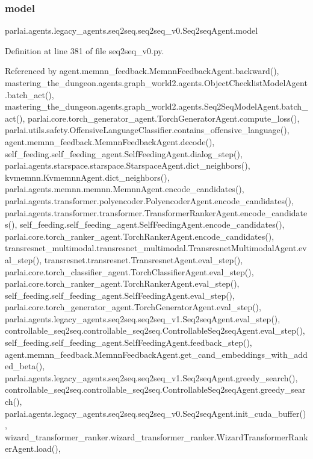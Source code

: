 \subsubsection{\texorpdfstring{model}{model}}
{\footnotesize\ttfamily parlai.\+agents.\+legacy\+\_\+agents.\+seq2seq.\+seq2seq\+\_\+v0.\+Seq2seq\+Agent.\+model}



Definition at line 381 of file seq2seq\+\_\+v0.\+py.



Referenced by agent.\+memnn\+\_\+feedback.\+Memnn\+Feedback\+Agent.\+backward(), mastering\+\_\+the\+\_\+dungeon.\+agents.\+graph\+\_\+world2.\+agents.\+Object\+Checklist\+Model\+Agent.\+batch\+\_\+act(), mastering\+\_\+the\+\_\+dungeon.\+agents.\+graph\+\_\+world2.\+agents.\+Seq2\+Seq\+Model\+Agent.\+batch\+\_\+act(), parlai.\+core.\+torch\+\_\+generator\+\_\+agent.\+Torch\+Generator\+Agent.\+compute\+\_\+loss(), parlai.\+utils.\+safety.\+Offensive\+Language\+Classifier.\+contains\+\_\+offensive\+\_\+language(), agent.\+memnn\+\_\+feedback.\+Memnn\+Feedback\+Agent.\+decode(), self\+\_\+feeding.\+self\+\_\+feeding\+\_\+agent.\+Self\+Feeding\+Agent.\+dialog\+\_\+step(), parlai.\+agents.\+starspace.\+starspace.\+Starspace\+Agent.\+dict\+\_\+neighbors(), kvmemnn.\+Kvmemnn\+Agent.\+dict\+\_\+neighbors(), parlai.\+agents.\+memnn.\+memnn.\+Memnn\+Agent.\+encode\+\_\+candidates(), parlai.\+agents.\+transformer.\+polyencoder.\+Polyencoder\+Agent.\+encode\+\_\+candidates(), parlai.\+agents.\+transformer.\+transformer.\+Transformer\+Ranker\+Agent.\+encode\+\_\+candidates(), self\+\_\+feeding.\+self\+\_\+feeding\+\_\+agent.\+Self\+Feeding\+Agent.\+encode\+\_\+candidates(), parlai.\+core.\+torch\+\_\+ranker\+\_\+agent.\+Torch\+Ranker\+Agent.\+encode\+\_\+candidates(), transresnet\+\_\+multimodal.\+transresnet\+\_\+multimodal.\+Transresnet\+Multimodal\+Agent.\+eval\+\_\+step(), transresnet.\+transresnet.\+Transresnet\+Agent.\+eval\+\_\+step(), parlai.\+core.\+torch\+\_\+classifier\+\_\+agent.\+Torch\+Classifier\+Agent.\+eval\+\_\+step(), parlai.\+core.\+torch\+\_\+ranker\+\_\+agent.\+Torch\+Ranker\+Agent.\+eval\+\_\+step(), self\+\_\+feeding.\+self\+\_\+feeding\+\_\+agent.\+Self\+Feeding\+Agent.\+eval\+\_\+step(), parlai.\+core.\+torch\+\_\+generator\+\_\+agent.\+Torch\+Generator\+Agent.\+eval\+\_\+step(), parlai.\+agents.\+legacy\+\_\+agents.\+seq2seq.\+seq2seq\+\_\+v1.\+Seq2seq\+Agent.\+eval\+\_\+step(), controllable\+\_\+seq2seq.\+controllable\+\_\+seq2seq.\+Controllable\+Seq2seq\+Agent.\+eval\+\_\+step(), self\+\_\+feeding.\+self\+\_\+feeding\+\_\+agent.\+Self\+Feeding\+Agent.\+feedback\+\_\+step(), agent.\+memnn\+\_\+feedback.\+Memnn\+Feedback\+Agent.\+get\+\_\+cand\+\_\+embeddings\+\_\+with\+\_\+added\+\_\+beta(), parlai.\+agents.\+legacy\+\_\+agents.\+seq2seq.\+seq2seq\+\_\+v1.\+Seq2seq\+Agent.\+greedy\+\_\+search(), controllable\+\_\+seq2seq.\+controllable\+\_\+seq2seq.\+Controllable\+Seq2seq\+Agent.\+greedy\+\_\+search(), parlai.\+agents.\+legacy\+\_\+agents.\+seq2seq.\+seq2seq\+\_\+v0.\+Seq2seq\+Agent.\+init\+\_\+cuda\+\_\+buffer(), wizard\+\_\+transformer\+\_\+ranker.\+wizard\+\_\+transformer\+\_\+ranker.\+Wizard\+Transformer\+Ranker\+Agent.\+load(), 